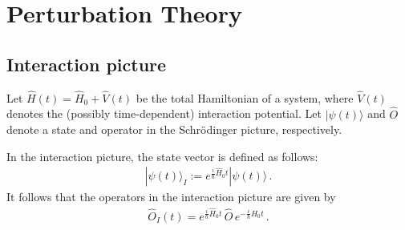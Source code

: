 \chapter{Perturbation Theory}

\section{Interaction picture}\label{section:interaction_picture}

    Let $\widehat{H}(t)=\widehat{H}_0+\widehat{V}(t)$ be the total Hamiltonian of a system, where $\widehat{V}(t)$ denotes the (possibly time-dependent) interaction potential. Let $|\psi(t)\rangle$ and $\widehat{O}$ denote a state and operator in the Schr\"odinger picture, respectively.

    \begin{definition}
        In the interaction picture, the state vector is defined as follows:
        \begin{gather}
            |\psi(t)\rangle_I := e^{\tfrac{i}{\hbar}\widehat{H}_0t}|\psi(t)\rangle\,.
        \end{gather}
        It follows that the operators in the interaction picture are given by
        \begin{gather}
            \widehat{O}_I(t) = e^{\tfrac{i}{\hbar}\widehat{H}_0t}\,\widehat{O}\,e^{-\tfrac{i}{\hbar}\widehat{H}_0t}\,.
        \end{gather}
    \end{definition}

